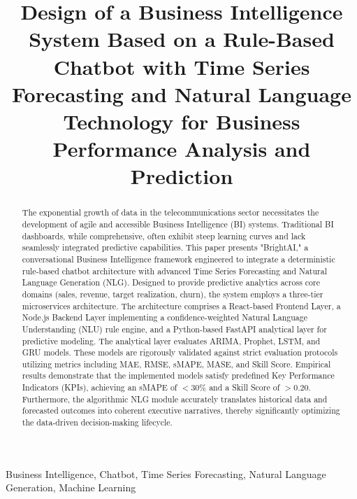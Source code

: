 \documentclass[conference]{IEEEtran}
\begin{document}
\title{Design of a Business Intelligence System Based on a Rule-Based Chatbot with Time Series Forecasting and Natural Language Technology for Business Performance Analysis and Prediction\\
}

\author{
}

\maketitle

\begin{abstract}
The exponential growth of data in the telecommunications sector necessitates the development of agile and accessible Business Intelligence (BI) systems. Traditional BI dashboards, while comprehensive, often exhibit steep learning curves and lack seamlessly integrated predictive capabilities. This paper presents "BrightAI," a conversational Business Intelligence framework engineered to integrate a deterministic rule-based chatbot architecture with advanced Time Series Forecasting and Natural Language Generation (NLG). Designed to provide predictive analytics across core domains (sales, revenue, target realization, churn), the system employs a three-tier microservices architecture. The architecture comprises a React-based Frontend Layer, a Node.js Backend Layer implementing a confidence-weighted Natural Language Understanding (NLU) rule engine, and a Python-based FastAPI analytical layer for predictive modeling. The analytical layer evaluates ARIMA, Prophet, LSTM, and GRU models. These models are rigorously validated against strict evaluation protocols utilizing metrics including MAE, RMSE, sMAPE, MASE, and Skill Score. Empirical results demonstrate that the implemented models satisfy predefined Key Performance Indicators (KPIs), achieving an sMAPE of $<30\%$ and a Skill Score of $>0.20$. Furthermore, the algorithmic NLG module accurately translates historical data and forecasted outcomes into coherent executive narratives, thereby significantly optimizing the data-driven decision-making lifecycle.
\end{abstract}

\begin{IEEEkeywords}
Business Intelligence, Chatbot, Time Series Forecasting, Natural Language Generation, Machine Learning
\end{IEEEkeywords}
\end{document}
